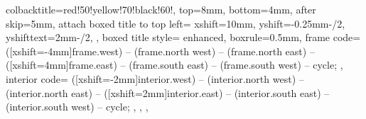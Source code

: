 {{    colbacktitle=red!50!yellow!70!black!60!,%
    top=8mm,
    bottom=4mm,
    after skip=5mm,
    attach boxed title to top left={%
      xshift=10mm,%
      yshift=-0.25mm-\tcboxedtitleheight/2,%
      yshifttext=2mm-\tcboxedtitleheight/2,%
    },
    boxed title style={%
      enhanced,%
      boxrule=0.5mm,%
      frame code={%
         ([xshift=-4mm]frame.west) -- (frame.north west)
        -- (frame.north east) -- ([xshift=4mm]frame.east)
        -- (frame.south east) -- (frame.south west) -- cycle;
      },
      interior code={
         ([xshift=-2mm]interior.west)
        -- (interior.north west) -- (interior.north east)
        -- ([xshift=2mm]interior.east) -- (interior.south east) -- (interior.south west)
        -- cycle;
      },
    },
  },
}

